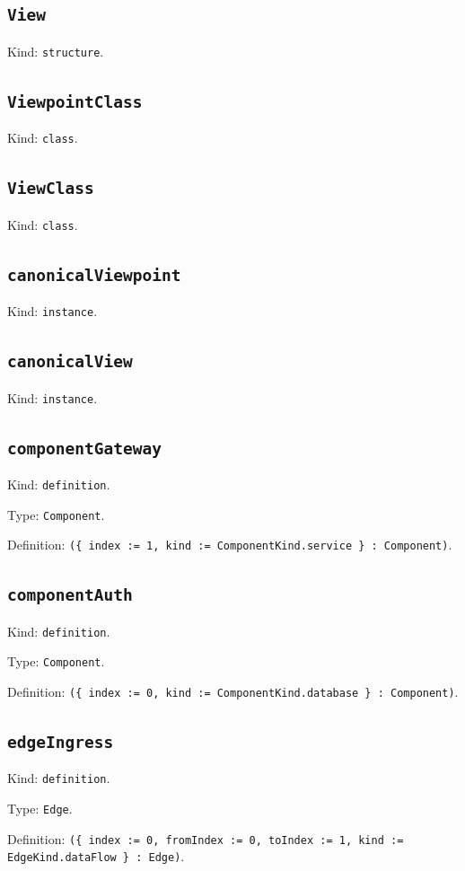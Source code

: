 \documentclass[11pt]{article}
\begin{document}
\subsection*{\texttt{View}}
\noindent Kind: \texttt{structure}.\par
\subsection*{\texttt{ViewpointClass}}
\noindent Kind: \texttt{class}.\par
\subsection*{\texttt{ViewClass}}
\noindent Kind: \texttt{class}.\par
\subsection*{\texttt{canonicalViewpoint}}
\noindent Kind: \texttt{instance}.\par
\subsection*{\texttt{canonicalView}}
\noindent Kind: \texttt{instance}.\par
\subsection*{\texttt{componentGateway}}
\noindent Kind: \texttt{definition}.\par
\noindent Type: \texttt{Component}.\par
\noindent Definition: \texttt{(\{ index := 1, kind := ComponentKind.service \} : Component)}.\par
\subsection*{\texttt{componentAuth}}
\noindent Kind: \texttt{definition}.\par
\noindent Type: \texttt{Component}.\par
\noindent Definition: \texttt{(\{ index := 0, kind := ComponentKind.database \} : Component)}.\par
\subsection*{\texttt{edgeIngress}}
\noindent Kind: \texttt{definition}.\par
\noindent Type: \texttt{Edge}.\par
\noindent Definition: \texttt{(\{ index := 0, fromIndex := 0, toIndex := 1, kind := EdgeKind.dataFlow \} : Edge)}.\par
\end{document}
